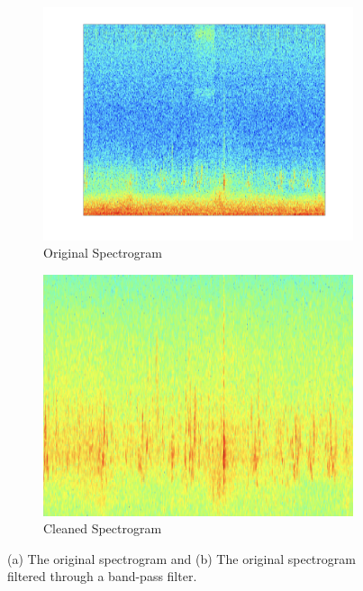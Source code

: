 \documentclass[12pt, conference]{IEEEtran}
\begin{document}
\begin{figure}[htbp]
    \centering
    \begin{subfigure}[b]{0.3\textwidth}
        \centering
        \includegraphics[width=\linewidth]{figures/spectrogram_original.png}
        \caption{Original Spectrogram}
        \label{fig:OriginalSpectrogram}
    \end{subfigure}
    \hfill
    \begin{subfigure}[b]{0.24\textwidth}
        \centering
        \includegraphics[width=\linewidth]{figures/spectrogram_clean.png}
        \caption{Cleaned Spectrogram}
        \label{fig:CleanedSpectrogram}
    \end{subfigure}
    \caption{(a) The original spectrogram and (b) The original spectrogram filtered through a band-pass filter.}
    \label{fig:spectrograms}
\end{figure}
\end{document}

